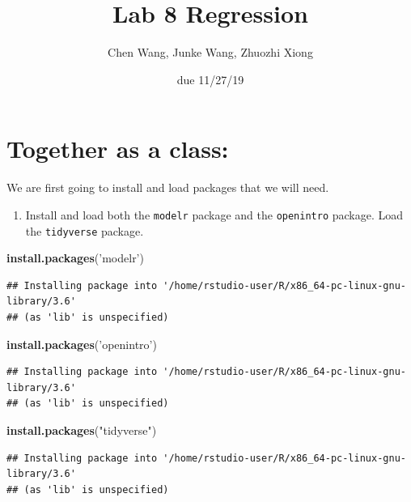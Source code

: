 \documentclass[]{article}
\title{Lab 8 Regression}
\author{Chen Wang, Junke Wang, Zhuozhi Xiong}
\date{due 11/27/19}
\newenvironment{Shaded}{\begin{snugshade}}{\end{snugshade}}
\newcommand{\KeywordTok}[1]{\textcolor[rgb]{0.13,0.29,0.53}{\textbf{#1}}}
\newcommand{\NormalTok}[1]{#1}
\newcommand{\StringTok}[1]{\textcolor[rgb]{0.31,0.60,0.02}{#1}}
\providecommand{\tightlist}{%
  \setlength{\itemsep}{0pt}\setlength{\parskip}{0pt}}
\begin{document}
\maketitle

\hypertarget{together-as-a-class}{%
\section{Together as a class:}\label{together-as-a-class}}

We are first going to install and load packages that we will need.

\begin{enumerate}
\def\labelenumi{\arabic{enumi}.}
\tightlist
\item
  Install and load both the \texttt{modelr} package and the
  \texttt{openintro} package. Load the \texttt{tidyverse} package.
\end{enumerate}

\begin{Shaded}
\begin{Highlighting}[]
\KeywordTok{install.packages}\NormalTok{(}\StringTok{'modelr'}\NormalTok{)}
\end{Highlighting}
\end{Shaded}

\begin{verbatim}
## Installing package into '/home/rstudio-user/R/x86_64-pc-linux-gnu-library/3.6'
## (as 'lib' is unspecified)
\end{verbatim}

\begin{Shaded}
\begin{Highlighting}[]
\KeywordTok{install.packages}\NormalTok{(}\StringTok{'openintro'}\NormalTok{)}
\end{Highlighting}
\end{Shaded}

\begin{verbatim}
## Installing package into '/home/rstudio-user/R/x86_64-pc-linux-gnu-library/3.6'
## (as 'lib' is unspecified)
\end{verbatim}

\begin{Shaded}
\begin{Highlighting}[]
\KeywordTok{install.packages}\NormalTok{(}\StringTok{"tidyverse"}\NormalTok{)}
\end{Highlighting}
\end{Shaded}

\begin{verbatim}
## Installing package into '/home/rstudio-user/R/x86_64-pc-linux-gnu-library/3.6'
## (as 'lib' is unspecified)
\end{verbatim}
\end{document}
